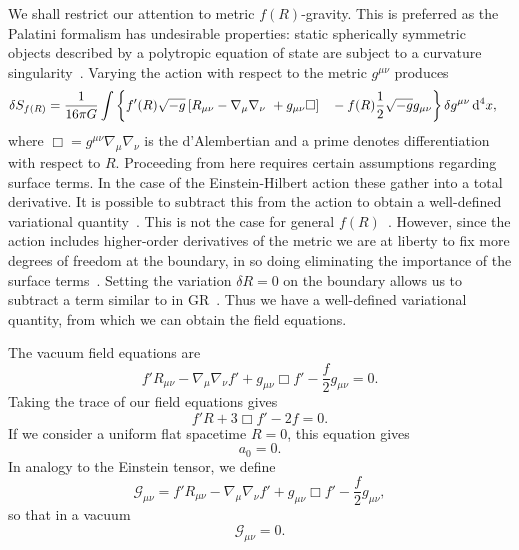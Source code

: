 We shall restrict our attention to metric $f(R)$-gravity. This is preferred as the Palatini formalism has undesirable properties: static spherically symmetric objects described by a polytropic equation of state are subject to a curvature singularity~\cite{Barausse2008b, Barausse2008a, DeFelice2010}. Varying the action with respect to the metric $g^{\mu\nu}$ produces
\begin{align}
\delta S_{f(R)} = {} & \recip{16\pi G}\int\left\{f'(R)\sqrt{-g}\left[R_{\mu\nu} - \nabla_\mu\nabla_\nu\ + g_{\mu\nu}\Box\right] \hphantom{\frac{0}{0}} \vphantom{\frac{0}{0}} - f(R)\recip{2}\sqrt{-g}g_{\mu\nu}\right\}\delta g^{\mu\nu}\,\dd^4x,
\end{align}
where $\Box = g^{\mu\nu}\nabla_\mu\nabla_\nu$ is the d'Alembertian and a prime denotes differentiation with respect to $R$. Proceeding from here requires certain assumptions regarding surface terms. In the case of the Einstein-Hilbert action these gather into a total derivative. It is possible to subtract this from the action to obtain a well-defined variational quantity~\cite{York1972, Gibbons1977}. This is not the case for general $f(R)$~\cite{Madsen1989}. However, since the action includes higher-order derivatives of the metric we are at liberty to fix more degrees of freedom at the boundary, in so doing eliminating the importance of the surface terms~\cite{Dyer2009a, Sotiriou2010}. Setting the variation $\delta R = 0$ on the boundary allows us to subtract a term similar to in GR~\cite{Guarnizo2010}. Thus we have a well-defined variational quantity, from which we can obtain the field equations.

The vacuum field equations are
\begin{equation}
f'R_{\mu\nu} - \nabla_\mu\nabla_\nu f' + g_{\mu\nu}\Box f' - \frac{f}{2}g_{\mu\nu} = 0.
\label{eq:Field_eq}
\end{equation}
Taking the trace of our field equations gives
\begin{equation}
f'R + 3\Box f' - 2f = 0.
\label{eq:Trace_eq}
\end{equation}
If we consider a uniform flat spacetime $R = 0$, this equation gives~\cite{Capozziello2007}
\begin{equation}
a_0 = 0.
\label{eq:a_0}
\end{equation}
In analogy to the Einstein tensor, we define
\begin{equation}
\mathcal{G}_{\mu\nu} = f'R_{\mu\nu} - \nabla_\mu\nabla_\nu f' + g_{\mu\nu}\Box f' - \frac{f}{2}g_{\mu\nu},
\label{eq:G_tensor}
\end{equation}
so that in a vacuum
\begin{equation}
\mathcal{G}_{\mu\nu} = 0.
\end{equation}

